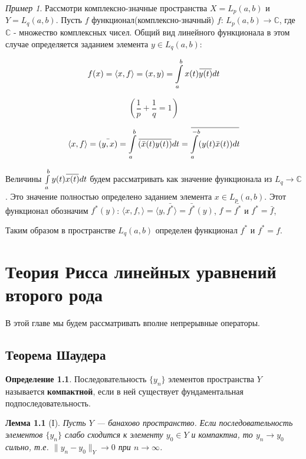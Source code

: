 \documentclass[12pt,a4paper,titlepage,oneside]{book}
\newcommand{\overbar}[1]{\mkern 1.5mu\overline{\mkern-1.5mu#1\mkern-1.5mu}\mkern 1.5mu}
\theoremstyle{definition}
\newtheorem*{definition}{Определение}
\theoremstyle{plain}
\theoremstyle{break}
\theoremstyle{remark}
\theoremstyle{remark}
\newtheorem*{example}{Пример}
\theoremstyle{remark}
\theoremstyle{remark}
\theoremstyle{plain}
\newtheorem*{lemma}{Лемма}
\theoremstyle{plain}
\begin{document}
\begin{example}
Рассмотри комплексно-значные пространства $X=L_p(a,b)$ и $Y=L_q(a,b)$. Пусть $f$ функционал(комплексно-значный) $f$: $L_p(a,b) \to \mathbb{C}$, где $\mathbb{C}$ - множество комплексных чисел. Общий вид линейного функционала в этом случае определяется заданием элемента $y \in L_q(a,b)$:

$$ f(x) = \langle x, f \rangle = (x,y) = \displaystyle\int\limits_a^b x(t)\overbar{y(t)}dt $$

$$ (\frac{1}{p} + \frac{1}{q} = 1) $$

$$ \langle x, f \rangle  = \bar{(y,x)}  = \displaystyle\int\limits_a^b \overbar{(\bar{x}(t)y(t))} dt = \overbar{\displaystyle\int\limits_a^{-b} (y(t)\bar{x}(t))dt} $$

Величины $\int\limits_a^b y(t)\overbar{x(t)} dt$ будем рассматривать как значение функционала из $L_q \to \mathbb{C}$. Это значение полностью определено заданием элемента $x \in L_p(a,b)$. Этот функционал обозначим $f^{*}(y)$:
$\langle x,f, \rangle = \langle y,\bar{f^{*}} \rangle = \bar{f^{*}}(y)$, $f=\bar{f^{*}}$ и $f^{*}=\bar{f}$,

Таким образом в пространстве $L_q(a,b)$ определен функционал $f^{*}$ и $f^{*}=f$.
\end{example}

\chapter{Теория Рисса линейных уравнений второго рода}

В этой главе мы будем рассматривать вполне непрерывные операторы.

\section{Теорема Шаудера}

\begin{definition}
Последовательность $\{y_n\}$ элементов пространства $Y$ называется \textbf{компактной}, если в ней существует фундаментальная подпоследовательность.
\end{definition}

\begin{lemma}[I]
Пусть $Y$ --- банахово пространство. Если последовательность элементов $\{y_n\}$ слабо сходится к элементу $y_0 \in Y$ и компактна, то $y_n\to y_0$ сильно, т.е. \mbox{$\lVert y_n - y_0\rVert_Y\to 0$} при $n\to\infty$.
\end{lemma}
\end{document}
